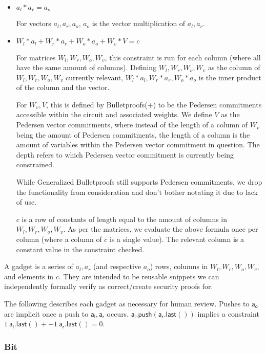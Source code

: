 \documentclass[]{article}
\begin{document}
\begin{itemize}
	\item
	$a_l * a_r = a_o$
	
	For vectors $a_l, a_r, a_o$, $a_o$ is the vector multiplication of $a_l, a_r$.
	\item
	$W_l * a_l + W_r * a_r + W_o * a_o + W_v * V = c$
	
	For matrices $W_l, W_r, W_o, W_v$, this constraint is run for each column (where all have the same amount of columns). Defining $W_l, W_r, W_o, W_v$ as the column of $W_l, W_r, W_o, W_v$ currently relevant, $W_l * a_l, W_r * a_r, W_o * a_o$ is the inner product of the column and the vector.
	
	For $W_v, V$, this is defined by Bulletproofs(+) to be the Pedersen commitments accessible within the circuit and associated weights. We define $V$ as the Pedersen vector commitments, where instead of the length of a column of $W_v$ being the amount of Pedersen commitments, the length of a column is the amount of variables within the Pedersen vector commitment in question. The depth refers to which Pedersen vector commitment is currently being constrained.
	
	While Generalized Bulletproofs still supports Pedersen commitments, we drop the functionality from consideration and don't bother notating it due to lack of use.
	
	$c$ is a row of constants of length equal to the amount of columns in $W_l, W_r, W_o, W_v$. As per the matrices, we evaluate the above formula once per column (where a column of $c$ is a single value). The relevant column is a constant value in the constraint checked.
\end{itemize}

A gadget is a series of $a_l, a_r$ (and respective $a_o$) rows, columns in $W_l, W_r, W_o, W_v$, and elements in $c$. They are intended to be reusable snippets we can independently formally verify as correct/create security proofs for.

\newcommand{\al}{\mathsf{a_l.push}}
\newcommand{\ar}{\mathsf{a_r.push}}

\newcommand{\all}{\mathsf{a_l.last()}}
\newcommand{\arl}{\mathsf{a_r.last()}}
\newcommand{\aol}{\mathsf{a_o.last()}}

The following describes each gadget as necessary for human review. Pushes to $\mathsf{a_o}$ are implicit once a push to $\mathsf{a_l}, \mathsf{a_r}$ occurs. $\al(\arl)$ implies a constraint $1 ~\all + -1 ~\arl = 0$.

\subsubsection{Bit}
\end{document}
